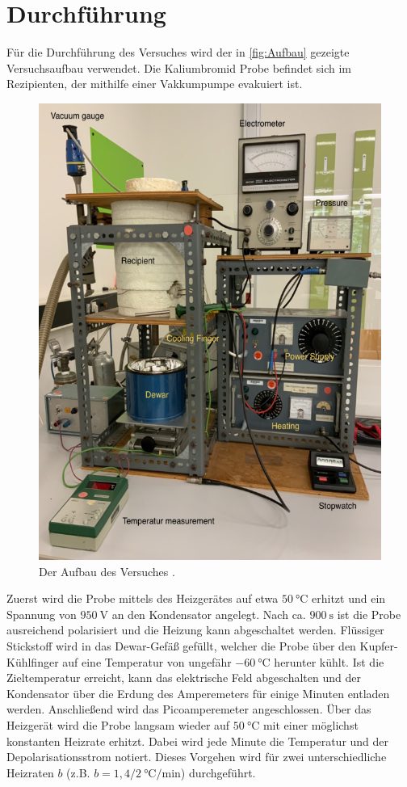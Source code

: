 \section{Durchführung}
\label{sec:Durchführung}
Für die Durchführung des Versuches wird der in \autoref{fig:Aufbau} gezeigte Versuchsaufbau verwendet.
Die Kaliumbromid Probe befindet sich im Rezipienten, der mithilfe einer Vakkumpumpe evakuiert ist.  
\begin{figure}
    \centering
    \includegraphics[width = .48\textwidth]{"content/pics/Aufbau.png"}
    \caption{Der Aufbau des Versuches \cite{v48}.}
    \label{fig:Aufbau}
\end{figure}
Zuerst wird die Probe mittels des Heizgerätes auf etwa $\qty{50}{\degreeCelsius}$ erhitzt und ein Spannung von $\qty{950}{\volt}$ an den Kondensator angelegt. 
Nach ca. $\qty{900}{\second}$ ist die Probe ausreichend polarisiert und die Heizung kann abgeschaltet werden. Flüssiger Stickstoff wird in das Dewar-Gefäß gefüllt, welcher 
die Probe über den Kupfer-Kühlfinger auf eine Temperatur von ungefähr $\qty{-60}{\degreeCelsius}$ herunter kühlt. Ist die Zieltemperatur erreicht, kann das elektrische Feld 
abgeschalten und der Kondensator über die Erdung des Amperemeters für einige Minuten entladen werden. Anschließend wird das Picoamperemeter angeschlossen. Über das Heizgerät wird die Probe langsam wieder auf 
$\qty{50}{\degreeCelsius}$ mit einer möglichst konstanten Heizrate erhitzt. Dabei wird jede Minute die Temperatur und der Depolarisationsstrom notiert.
Dieses Vorgehen wird für zwei unterschiedliche Heizraten $b$ (z.B. $b = 1,4 / \qty{2}{\degreeCelsius\per\minute}$) durchgeführt.
